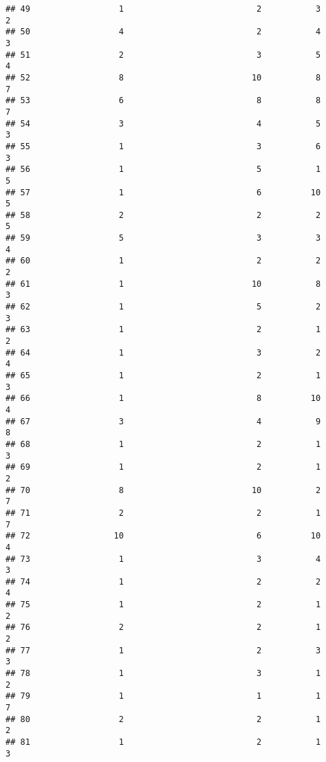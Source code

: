 \documentclass[
]{article}
\begin{document}
\begin{verbatim}
## 49                  1                           2           3               2
## 50                  4                           2           4               3
## 51                  2                           3           5               4
## 52                  8                          10           8               7
## 53                  6                           8           8               7
## 54                  3                           4           5               3
## 55                  1                           3           6               3
## 56                  1                           5           1               5
## 57                  1                           6          10               5
## 58                  2                           2           2               5
## 59                  5                           3           3               4
## 60                  1                           2           2               2
## 61                  1                          10           8               3
## 62                  1                           5           2               3
## 63                  1                           2           1               2
## 64                  1                           3           2               4
## 65                  1                           2           1               3
## 66                  1                           8          10               4
## 67                  3                           4           9               8
## 68                  1                           2           1               3
## 69                  1                           2           1               2
## 70                  8                          10           2               7
## 71                  2                           2           1               7
## 72                 10                           6          10               4
## 73                  1                           3           4               3
## 74                  1                           2           2               4
## 75                  1                           2           1               2
## 76                  2                           2           1               2
## 77                  1                           2           3               3
## 78                  1                           3           1               2
## 79                  1                           1           1               7
## 80                  2                           2           1               2
## 81                  1                           2           1               3

\end{verbatim}
\end{document}

